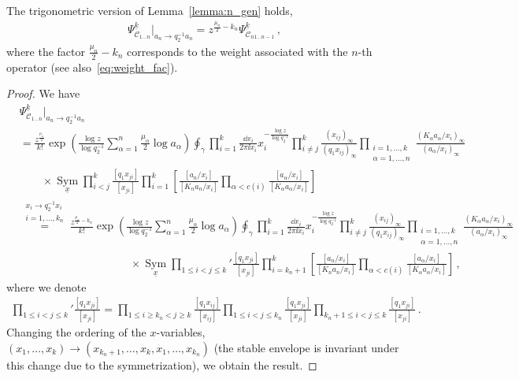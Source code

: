 \begin{lemma}
    The trigonometric version of Lemma~\ref{lemma:n_gen} holds,
\begin{align}
    \Psi^{\underline{k}}_{\mathscr{C}_{1\ldots n}}\Big|_{a_n \to q_2^{-1} a_n} = z^{\frac{\mu_n}{2}-k_n} \Psi^{\underline{k}}_{\mathscr{C}_{n1\ldots n-1}}
    \, ,
\end{align}    
    where the factor $\frac{\mu_n}{2}-k_n$ corresponds to the weight associated with the $n$-th operator (see also~\eqref{eq:weight_fac}).
\end{lemma}
\begin{proof}
We have
\begin{align}
    & \Psi_{\mathscr{C}_{1\ldots n}}^{\underline{k}}\Big|_{a_n \to q_2^{-1} a_n}
    \nonumber \\
    & = \frac{z^{\frac{\mu_\alpha}{2}}}{k!} \exp\left( \frac{\log z}{\log q_2^{-1}} \sum_{\alpha=1}^n \frac{\mu_\alpha}{2} \log a_\alpha \right) \oint_\gamma \prod_{i=1}^k \frac{\dd{x}_i}{2 \pi \ii x_i} x_i^{-\frac{\log z}{\log q_2^{-1}}} \prod_{i \neq j}^k \frac{(x_{ij})_\infty}{(q_1 x_{ij})_\infty} \prod_{\substack{i=1,\ldots,k \\ \alpha=1,\ldots,n}} \frac{(K_\alpha a_\alpha/x_i)_\infty}{( a_\alpha/x_i)_\infty} 
    \nonumber \\
    & \qquad \times
    \operatorname*{Sym}_{\underline{x}}
    \prod_{i<j}^k \frac{[q_1 x_{ji}]}{[x_{ji}]} 
    \prod_{i=1}^k \left[ \frac{[a_n/x_i]}{[K_n a_n / x_i]} \prod_{\alpha < c(i)} \frac{[a_\alpha/x_i]}{[K_\alpha a_\alpha / x_i]} \right]
    \nonumber \\
    & \stackrel{\substack{x_i \to q_2^{-1} x_i \\ i=1,\ldots,k_n}}{=} \frac{z^{\frac{\mu_\alpha}{2}-k_n}}{k!} \exp\left( \frac{\log z}{\log q_2^{-1}} \sum_{\alpha=1}^n \frac{\mu_\alpha}{2} \log a_\alpha \right) \oint_\gamma \prod_{i=1}^k \frac{\dd{x}_i}{2 \pi \ii x_i} x_i^{-\frac{\log z}{\log q_2^{-1}}} \prod_{i \neq j}^k \frac{(x_{ij})_\infty}{(q_1 x_{ij})_\infty} \prod_{\substack{i=1,\ldots,k \\ \alpha=1,\ldots,n}} \frac{(K_\alpha a_\alpha/x_i)_\infty}{( a_\alpha/x_i)_\infty}
    \nonumber \\
    & \hspace{10em} \times 
    \operatorname*{Sym}_{\underline{x}}
    \prod_{1 \le i<j \le k}' \frac{[q_1 x_{ji}]}{[x_{ji}]} 
    \prod_{i=k_n+1}^k \left[ \frac{[a_n/x_i]}{[K_n a_n / x_i]} \prod_{\alpha < c(i)} \frac{[a_\alpha/x_i]}{[K_\alpha a_\alpha / x_i]} \right]
    \, ,
\end{align}
where we denote
\begin{align}
    \prod_{1 \le i<j \le k}' \frac{[q_1 x_{ji}]}{[x_{ji}]} = \prod_{1 \le i \ge k_n < j \ge k} \frac{[q_1 x_{ij}]}{[x_{ij}]} \prod_{1 \le i < j \le k_n} \frac{[q_1 x_{ji}]}{[x_{ji}]} \prod_{k_n+1 \le i < j \le k} \frac{[q_1 x_{ji}]}{[x_{ji}]}
    \, .
\end{align}
Changing the ordering of the $x$-variables, $(x_1,\ldots,x_k) \to (x_{k_n+1},\ldots,x_k,x_1,\ldots,x_{k_n})$ (the stable envelope is invariant under this change due to the symmetrization), we obtain the result.
\end{proof}

